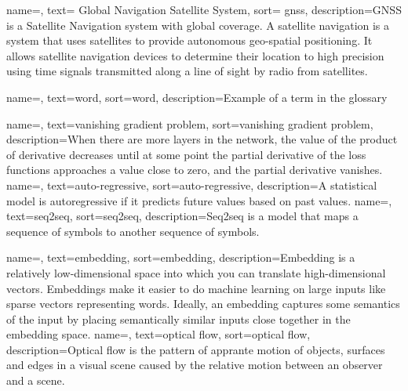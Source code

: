 {
    name=,
    text= Global Navigation Satellite System,
    sort= gnss,
    description={GNSS is a Satellite Navigation system with global coverage. A satellite navigation is a system that uses satellites to provide autonomous geo-spatial positioning. It allows satellite navigation devices to determine their location to high precision using time signals transmitted along a line of sight by radio from satellites.}
}




{
    name=,
    text=word,
    sort=word,
    description={Example of a term in the glossary}
}

{
    name=,
    text=vanishing gradient problem,
    sort=vanishing gradient problem,
    description={When there are more layers in the network, the value of the product of derivative decreases until at some point the partial derivative of the loss functions approaches a value close to zero, and the partial derivative vanishes.}
}
{
    name=,
    text=auto-regressive,
    sort=auto-regressive,
    description={A statistical  model is autoregressive if it predicts future values based on past values.}
}
{
    name=,
    text=seq2seq,
    sort=seq2seq,
    description={Seq2seq is a model that maps a sequence of symbols to another sequence of symbols.}
}

{
    name=,
    text=embedding,
    sort=embedding,
    description={Embedding is a relatively low-dimensional space into which you can translate high-dimensional vectors. Embeddings make it easier to do machine learning on large inputs like sparse vectors representing words. Ideally, an embedding captures some semantics of the input by placing semantically similar inputs close together in the embedding space.}
}
{
    name=,
    text=optical flow,
    sort=optical flow,
    description={Optical flow is the pattern of apprante motion of objects, surfaces and edges in a visual scene caused by the relative motion between an observer and a scene.}
}




